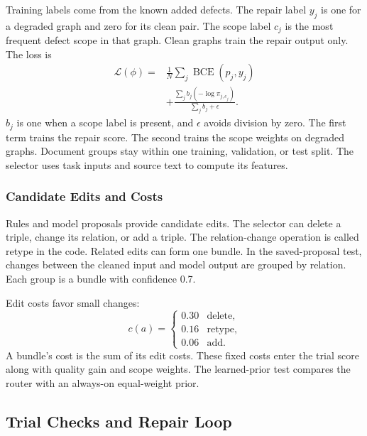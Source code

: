 Training labels come from the known added defects.
The repair label $y_j$ is one for a degraded graph and zero for its clean pair.
The scope label $c_j$ is the most frequent defect scope in that graph.
Clean graphs train the repair output only.
The loss is
\begin{equation}
\label{eq:decision_loss}
\begin{split}
\mathcal L(\phi)={}&\frac1N\sum_j\operatorname{BCE}(p_j,y_j)\\
&+\frac{\sum_j b_j(-\log\pi_{j,c_j})}{\sum_j b_j+\epsilon}.
\end{split}
\end{equation}
$b_j$ is one when a scope label is present, and $\epsilon$ avoids division by zero.
The first term trains the repair score.
The second trains the scope weights on degraded graphs.
Document groups stay within one training, validation, or test split.
The selector uses task inputs and source text to compute its features.

\subsubsection{Candidate Edits and Costs}
\label{sec:method:modalities}

Rules and model proposals provide candidate edits.
The selector can delete a triple, change its relation, or add a triple.
The relation-change operation is called retype in the code.
Related edits can form one bundle.
In the saved-proposal test, changes between the cleaned input and model output
are grouped by relation.
Each group is a bundle with confidence 0.7.

Edit costs favor small changes:
\begin{equation}
\label{eq:cost_hierarchy}
c(a)=\begin{cases}
0.30 & \text{delete},\\
0.16 & \text{retype},\\
0.06 & \text{add}.
\end{cases}
\end{equation}
A bundle's cost is the sum of its edit costs.
These fixed costs enter the trial score along with quality gain and scope weights.
The learned-prior test compares the router with an always-on equal-weight prior.

\subsection{Trial Checks and Repair Loop}
\label{sec:method:algorithm}

